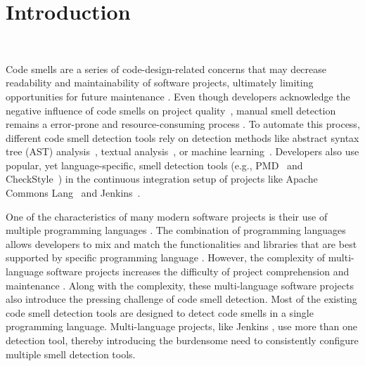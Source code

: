 \section{Introduction}~\label{sec:introduction}

\vspace*{-1em}


Code smells are a series of code-design-related concerns that may decrease
readability \cite{5741260,SANTOS2018450} and maintainability
\cite{6392174,6405287} of software projects, ultimately limiting opportunities
for future maintenance \cite{Fowler_Beck}. Even though developers acknowledge
the negative influence of code smells on project quality~\cite{developersCare},
manual smell detection remains a error-prone and resource-consuming process
\cite{DetectingDefectsInObject}. To automate this process, different code smell
detection tools rely on detection methods like abstract syntax tree (AST)
analysis~\cite{Lenarduzzi2023}, textual analysis~\cite{Palomba}, or machine
learning~\cite{ML}. Developers also use popular, yet language-specific, smell
detection tools (e.g., PMD~\cite{PMD} and CheckStyle~\cite{CheckStyle}) in the
continuous integration setup of projects like Apache Commons
Lang~\cite{ApacheCommonsLang} and Jenkins~\cite{Jekins}.


One of the characteristics of many modern software projects is their use of
multiple programming languages \cite{723183}. The combination of programming
languages allows developers to mix and match the functionalities and libraries
that are best supported by specific programming language \cite{7476675}.
However, the complexity of multi-language software projects increases the
difficulty of project comprehension and maintenance \cite{7476675,
10.1109/SCAM.2012.11, 7396422}. Along with the complexity, these multi-language
software projects also introduce the pressing challenge of code smell detection.
Most of the existing code smell detection tools are designed to detect code
smells in a single programming language. Multi-language projects, like Jenkins
\cite{Jekins}, use more than one detection tool, thereby introducing the
burdensome need to consistently configure multiple smell detection tools.


